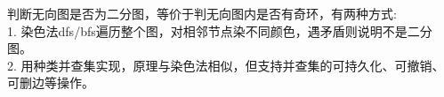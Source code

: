 判断无向图是否为二分图，等价于判无向图内是否有奇环，有两种方式:\\ 
1. 染色法dfs/bfs遍历整个图，对相邻节点染不同颜色，遇矛盾则说明不是二分图。\\ 
2. 用种类并查集实现，原理与染色法相似，但支持并查集的可持久化、可撤销、可删边等操作。\\ 